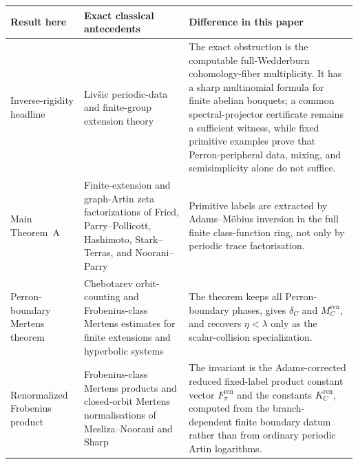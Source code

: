 \begin{center}
\begin{tabular}{L{0.20\textwidth}L{0.38\textwidth}L{0.34\textwidth}}
  \toprule
  \textbf{Result here} & \textbf{Exact classical antecedents} & \textbf{Difference in this paper}\\
  \midrule
  Inverse-rigidity headline & Liv\v{s}ic periodic-data and finite-group
  extension theory
  \cite{Parry1999LivsicNonAbelian,ParryPollicott1997LivsicCompactLie,BoyleSchmieding2017FiniteGroupExtensions}
  & The exact obstruction is the computable full-Wedderburn cohomology-fiber
  multiplicity.  It has a sharp multinomial formula for finite abelian
  bouquets; a common spectral-projector certificate remains a sufficient
  witness, while fixed primitive examples prove that Perron-peripheral data,
  mixing, and semisimplicity alone do not suffice.\\[0.5ex]
  Main Theorem~A & Finite-extension and graph-Artin zeta factorizations of
  Fried, Parry--Pollicott, Hashimoto, Stark--Terras, and Noorani--Parry
  \cite{Fried1983PeriodicPointsTwistedCoefficients,ParryPollicott1990Zeta,Hashimoto1989ZetaFiniteGraphs,StarkTerras1996FiniteGraphsCoverings,NooraniParry1992ChebotarevShifts}
  & Primitive labels are extracted by Adams--M\"obius inversion in the full
  finite class-function ring, not only by periodic trace factorisation.\\[0.5ex]
  Perron-boundary Mertens theorem & Chebotarev orbit-counting and Frobenius-class Mertens
  estimates for finite extensions and hyperbolic systems
  \cite{ParryPollicott1986Chebotarev,NooraniParry1992ChebotarevShifts,MeslizaNoorani1999FrobeniusMertens}
  & The theorem keeps all Perron-boundary phases, gives \(\delta_C\) and
  \(M_C^{\mathrm{ren}}\), and recovers \(\eta<\lambda\) only as the
  scalar-collision specialization.\\[0.5ex]
  Renormalized Frobenius product & Frobenius-class Mertens products and
  closed-orbit Mertens normalisations of Mesliza--Noorani and Sharp
  \cite{MeslizaNoorani1999FrobeniusMertens,Sharp1991Mertens}
  & The invariant is the Adams-corrected reduced fixed-label product constant
  vector \(F_\pi^{\mathrm{ren}}\) and the constants
  \(K_C^{\mathrm{ren}}\), computed from the branch-dependent finite boundary
  datum rather than from ordinary periodic Artin logarithms.\\
  \bottomrule
\end{tabular}
\end{center}

